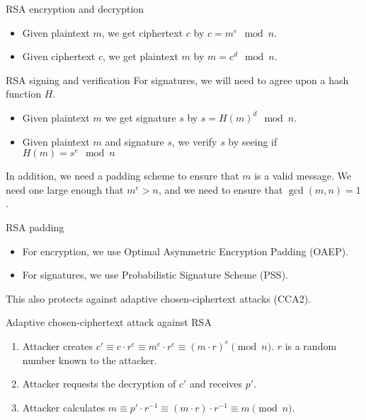 \begin{tecbox}{RSA encryption and decryption}{}
    \begin{itemize}
        \item Given plaintext $m$, we get ciphertext $c$ by $c = m^e \mod{n}$.
        \item Given ciphertext $c$, we get plaintext $m$ by $m = c^d \mod{n}$.
    \end{itemize}
\end{tecbox}

\begin{tecbox}{RSA signing and verification}{}
    For signatures, we will need to agree upon a hash function $H$.
    \begin{itemize}
        \item Given plaintext $m$ we get signature $s$ by $s = H(m)^d \mod n$.
        \item Given plaintext $m$ and signature $s$, we verify $s$ by seeing if $H(m) = s^e \mod{n}$
    \end{itemize}
\end{tecbox}

In addition, we need a padding scheme to ensure that $m$ is a valid message. We need one large enough that $m^e > n$, and we need to ensure that $\gcd(m,n) = 1$.

\begin{tecbox}{RSA padding}{}
    \begin{itemize}
        \item For encryption, we use Optimal Asymmetric Encryption Padding (OAEP).
        \item For signatures, we use Probabilistic Signature Scheme (PSS).
    \end{itemize}
\end{tecbox}

This also protects against adaptive chosen-ciphertext attacks (CCA2).

\begin{tecbox}{Adaptive chosen-ciphertext attack against RSA}{}
    \begin{enumerate}
        \item Attacker creates $c\prime \equiv c \cdot r^e \equiv m^e \cdot r^e \equiv (m \cdot r)^e \pmod{n}$. $r$ is a random number known to the attacker.
        \item Attacker requests the decryption of $c\prime$ and receives $p\prime$.
        \item Attacker calculates $m \equiv p\prime \cdot r^{-1} \equiv (m \cdot r) \cdot r^{-1} \equiv m \pmod{n}$.
    \end{enumerate}
\end{tecbox}

